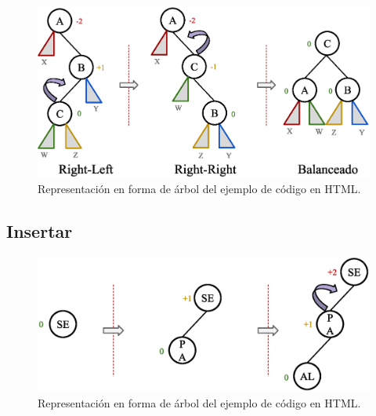 \begin{figure}[htpb!]
  \begin{center}
    \includegraphics[width=1.0\textwidth]{images/AVLRotation2.eps}
  \end{center}
  \caption{Representación en forma de árbol del ejemplo de código en HTML.}
  \label{fig:AVLRotation2}
\end{figure}

\subsection{Insertar}

\begin{figure}[htpb!]
  \begin{center}
    \includegraphics[width=1.0\textwidth]{images/AVLInsertion1.eps}
  \end{center}
  \caption{Representación en forma de árbol del ejemplo de código en HTML.}
  \label{fig:AVLInsertion1}
\end{figure}

